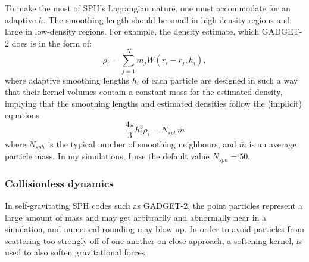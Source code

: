 To make the most of SPH's Lagrangian nature, one must accommodate for an adaptive $h$. The smoothing length should be small in high-density regions and large in low-density regions. For example, the density estimate,  which GADGET-2 does is in the form of:
\begin{equation}
    \rho_i = \sum_{j=1}^{N} m_j W(r_i -r_j,h_i),
\end{equation}
where adaptive smoothing lengths $h_i$ of each particle are designed in such a way that their kernel volumes contain a constant mass for the estimated density, implying that the smoothing lengths and estimated densities follow the (implicit) equations
\begin{equation}
    \frac{4\pi}{3} h_{i}^3 \rho_i = N_{sph} \bar{m}
\end{equation}
where $N_{sph}$ is the typical number of smoothing neighbours, and $\bar{m}$ is an average particle mass. In my simulations, I use the default value $N_{sph}=50$. 

\subsubsection{Collisionless dynamics}

In self-gravitating SPH codes such as GADGET-2, the point particles represent a large amount of mass and may get arbitrarily and abnormally near in a simulation, and numerical rounding may blow up. In order to avoid particles from scattering too strongly off of one another on close approach, a softening kernel, is used to also soften gravitational forces. 

